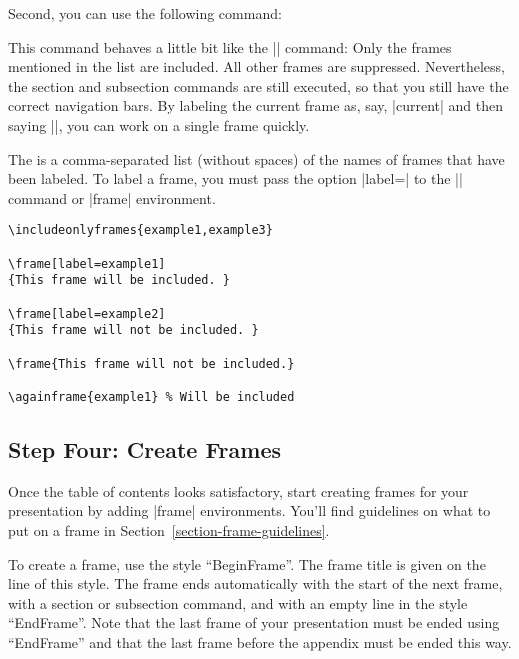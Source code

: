Second, you can use the following command:

\begin{command}{{}}
  This command behaves a little bit like the || command:
  Only the frames mentioned in the list are included. All other frames
  are suppressed. Nevertheless, the section and subsection commands
  are still executed, so that you still have the correct navigation
  bars. By labeling the current frame as, say, |current| and then
  saying ||, you can work on a single frame
  quickly.  

  The  is a comma-separated list (without
  spaces) of the names of frames that have been labeled. To label a
  frame, you must pass the option |label=| to the |\frame|
  command or |frame| environment.

  \example
\begin{verbatim}
\includeonlyframes{example1,example3}

\frame[label=example1]
{This frame will be included. }

\frame[label=example2]
{This frame will not be included. }

\frame{This frame will not be included.}

\againframe{example1} % Will be included
\end{verbatim}
\end{command}



\subsection{Step Four: Create Frames}

Once the table of contents looks satisfactory, start creating frames
for your presentation by adding |frame| environments. You'll find
guidelines on what to put on a frame in
Section~\ref{section-frame-guidelines}. 

\lyxnote
To create a frame, use the style ``BeginFrame''. The frame title
is given on the line of this style. The frame ends automatically with
the start of the next frame, with a section or subsection command, and
with an empty line in the style ``EndFrame''. Note that the last frame
of your presentation must be ended using ``EndFrame'' and that the
last frame before the appendix must be ended this way.





